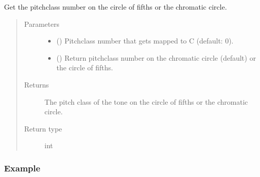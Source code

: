 \documentclass[letterpaper,10pt,english]{sphinxmanual}
\begin{document}
\begin{fulllineitems}
\begin{fulllineitems}
Get the pitch\sphinxhyphen{}class number on the circle of fifths or the chromatic circle.
\begin{quote}\begin{description}
\item[{Parameters}] \leavevmode\begin{itemize}
\item {} 
 () \textendash{} Pitch\sphinxhyphen{}class number that gets mapped to C (default: 0).

\item {} 
 () \textendash{} Return pitch\sphinxhyphen{}class number on the chromatic circle (default) or the circle of fifths.

\end{itemize}

\item[{Returns}] \leavevmode
The pitch class of the tone on the circle of fifths or the chromatic circle.

\item[{Return type}] \leavevmode
int

\end{description}\end{quote}
\subsubsection*{Example}

\begin{sphinxVerbatim}[commandchars=\\\{\}]
   
\end{sphinxVerbatim}

\begin{sphinxVerbatim}[commandchars=\\\{\}]
   
\end{sphinxVerbatim}


\end{fulllineitems}
\end{fulllineitems}
\end{document}
